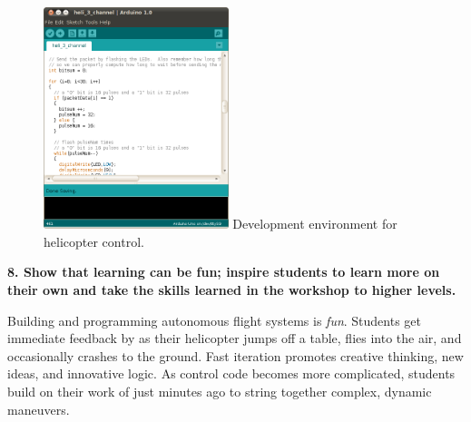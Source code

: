 \documentclass[11pt]{article}
\begin{document}
\vspace{20pt}
\begin{figure}
    \begin{center}
    \includegraphics[width=0.48\textwidth]{figures/program.png}
    {\small Development environment for helicopter control.}
    \end{center}
    \vspace{-20pt}
\end{figure}
\textbf{8. Show that learning can be fun; inspire students to learn more on their own and take the skills learned in the workshop to higher levels.}

Building and programming autonomous flight systems is \textit{fun}.  Students get immediate feedback by as their helicopter jumps off a table, flies into the air, and occasionally crashes to the ground.  Fast iteration promotes creative thinking, new ideas, and innovative logic.  As control code becomes more complicated, students build on their work of just minutes ago to string together complex, dynamic maneuvers.




\end{document}
